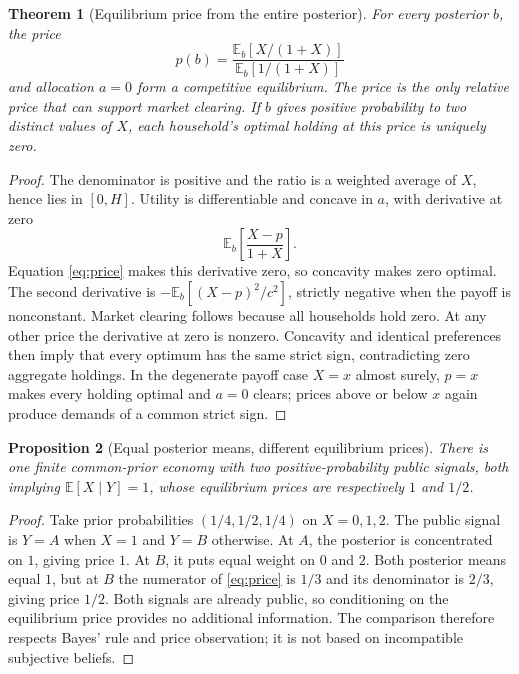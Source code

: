 \documentclass[11pt]{article}
\newtheorem{theorem}{Theorem}
\newtheorem{proposition}[theorem]{Proposition}
\theoremstyle{definition}
\theoremstyle{remark}
\begin{document}
\begin{theorem}[Equilibrium price from the entire posterior]
For every posterior $b$, the price
\begin{equation}
 p(b)=\frac{\mathbb E_b[X/(1+X)]}{\mathbb E_b[1/(1+X)]}\label{eq:price}
\end{equation}
and allocation $a=0$ form a competitive equilibrium. The price is the only relative price that can support market clearing. If $b$ gives positive probability to two distinct values of $X$, each household's optimal holding at this price is uniquely zero.
\end{theorem}
\begin{proof}
The denominator is positive and the ratio is a weighted average of $X$, hence lies in $[0,H]$. Utility is differentiable and concave in $a$, with derivative at zero
\[
 \mathbb E_b\left[\frac{X-p}{1+X}\right].
\]
Equation \eqref{eq:price} makes this derivative zero, so concavity makes zero optimal. The second derivative is $-\mathbb E_b[(X-p)^2/c^2]$, strictly negative when the payoff is nonconstant. Market clearing follows because all households hold zero. At any other price the derivative at zero is nonzero. Concavity and identical preferences then imply that every optimum has the same strict sign, contradicting zero aggregate holdings. In the degenerate payoff case $X=x$ almost surely, $p=x$ makes every holding optimal and $a=0$ clears; prices above or below $x$ again produce demands of a common strict sign.
\end{proof}

\begin{proposition}[Equal posterior means, different equilibrium prices]
There is one finite common-prior economy with two positive-probability public signals, both implying $\mathbb E[X\mid Y]=1$, whose equilibrium prices are respectively $1$ and $1/2$.
\end{proposition}
\begin{proof}
Take prior probabilities $(1/4,1/2,1/4)$ on $X=0,1,2$. The public signal is $Y=A$ when $X=1$ and $Y=B$ otherwise. At $A$, the posterior is concentrated on $1$, giving price $1$. At $B$, it puts equal weight on $0$ and $2$. Both posterior means equal $1$, but at $B$ the numerator of \eqref{eq:price} is $1/3$ and its denominator is $2/3$, giving price $1/2$. Both signals are already public, so conditioning on the equilibrium price provides no additional information. The comparison therefore respects Bayes' rule and price observation; it is not based on incompatible subjective beliefs.
\end{proof}
\end{document}
